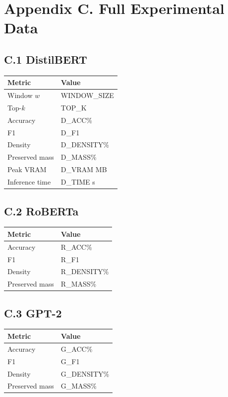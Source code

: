 
\section{Appendix C. Full Experimental Data}

\subsection{C.1 DistilBERT}

\begin{table}[H]
\centering
\small
\begin{tabular}{ll}
\toprule
\textbf{Metric} & \textbf{Value} \\
\midrule
Window $w$ & {{WINDOW\_SIZE}} \\
Top-$k$ & {{TOP\_K}} \\
Accuracy & {{D\_ACC}}\% \\
F1 & {{D\_F1}} \\
Density & {{D\_DENSITY}}\% \\
Preserved mass & {{D\_MASS}}\% \\
Peak VRAM & {{D\_VRAM}} MB \\
Inference time & {{D\_TIME}} s \\
\bottomrule
\end{tabular}
\end{table}

\subsection{C.2 RoBERTa}

\begin{table}[H]
\centering
\small
\begin{tabular}{ll}
\toprule
\textbf{Metric} & \textbf{Value} \\
\midrule
Accuracy & {{R\_ACC}}\% \\
F1 & {{R\_F1}} \\
Density & {{R\_DENSITY}}\% \\
Preserved mass & {{R\_MASS}}\% \\
\bottomrule
\end{tabular}
\end{table}

\subsection{C.3 GPT-2}

\begin{table}[H]
\centering
\small
\begin{tabular}{ll}
\toprule
\textbf{Metric} & \textbf{Value} \\
\midrule
Accuracy & {{G\_ACC}}\% \\
F1 & {{G\_F1}} \\
Density & {{G\_DENSITY}}\% \\
Preserved mass & {{G\_MASS}}\% \\
\bottomrule
\end{tabular}
\end{table}

